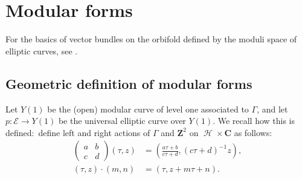 \documentclass[12pt]{amsart}
\theoremstyle{plain}
\theoremstyle{definition}
\theoremstyle{remark}
\newcommand{\cE}{\mathcal{E}}
\DeclareMathOperator{\uhp}{\mathcal{H}}
\providecommand{\stwomat}[4]{\left(\begin{smallmatrix}#1&#2\\#3&#4\end{smallmatrix}\right)}
\newcommand{\CC}{\mathbf{C}}
\newcommand{\ZZ}{\mathbf{Z}}
\begin{document}

\section{Modular forms}
\label{s:modforms}
For the basics of vector bundles on the orbifold defined by the moduli space of elliptic curves, see \cite{Hain}.

\subsection{Geometric definition of modular forms}
Let $Y(1)$ be the (open) modular curve of level one associated to  $\Gamma$, and let $p\colon \cE \to Y(1)$ be the universal elliptic curve over $Y(1)$. We recall how this is defined:\ define left and right actions of $\Gamma$ and $\ZZ^2$ on $\uhp\times \CC$ as follows:
\begin{align*}
    \stwomat abcd (\tau,z) &= (\tfrac{a\tau+b}{c\tau+d},(c\tau+d)^{-1}z),\\
    (\tau,z) \cdot (m,n) &= (\tau, z+m\tau + n).
\end{align*}
\end{document}
